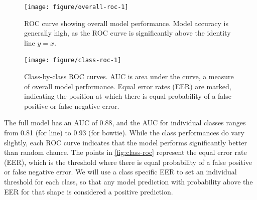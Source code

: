 \documentclass{article}\usepackage[]{graphicx}\usepackage[table]{xcolor}
\newenvironment{knitrout}{}{} %
\begin{document}
\begin{knitrout}
\color{fgcolor}\begin{figure}

{\centering \texttt{[image: figure/overall-roc-1]}

}

\caption[Overall model performance ROC curve.]{ROC curve showing overall model performance. Model accuracy is generally high, as the ROC curve is significantly above the identity line $y=x$.}\label{fig:overall-roc}
\end{figure}


\end{knitrout}

\begin{knitrout}
\color{fgcolor}\begin{figure}

{\centering \texttt{[image: figure/class-roc-1]}

}

\caption[Class-by-class ROC curves.]{Class-by-class ROC curves. AUC is area under the curve, a measure of overall model performance. Equal error rates (EER) are marked, indicating the position at which there is equal probability of a false positive or false negative error.}\label{fig:class-roc}
\end{figure}


\end{knitrout}

The full model has an AUC of 0.88, and the AUC for individual classes ranges from 0.81 (for line) to 0.93  (for bowtie).
While the class performances do vary slightly, each ROC curve indicates that the model performs significantly better than random chance. The points in \autoref{fig:class-roc} represent the equal error rate (EER), which is the threshold where there is equal probability of a false positive or false negative error. We will use a class specific EER to set an individual threshold for each class, so that any model prediction with probability above the EER for that shape is considered a positive prediction.
\end{document}
